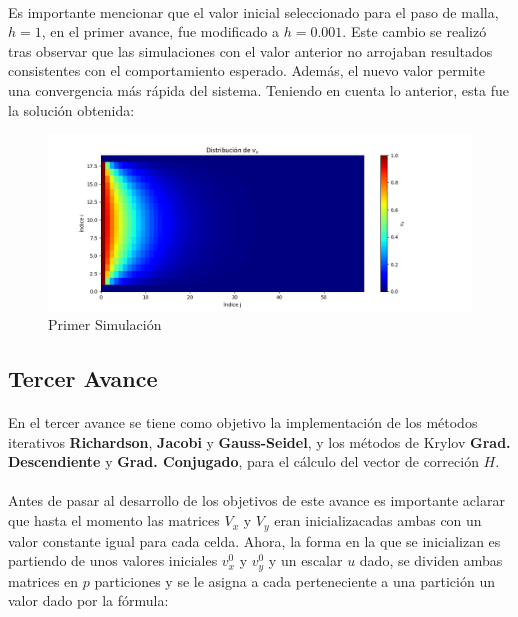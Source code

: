 \documentclass{article}
\begin{document}
  \paragraph{}
  Es importante mencionar que el valor inicial seleccionado para el paso de malla, $h=1$, en el primer avance, fue modificado a $h=0.001$. Este cambio se realizó tras observar que las simulaciones con el valor anterior no arrojaban resultados consistentes con el comportamiento esperado. Además, el nuevo valor permite una convergencia más rápida del sistema. Teniendo en cuenta lo anterior, esta fue la solución obtenida:

  \begin{figure}[H]
    \centering
    \includegraphics[width=1.2\textwidth]{GaussJordanSol.png}
    \caption{Primer Simulación}
  \end{figure}

  \subsection*{Tercer Avance}
  \paragraph{}
  En el tercer avance se tiene como objetivo la implementación de los métodos iterativos \textbf{Richardson}, \textbf{Jacobi} y \textbf{Gauss-Seidel}, y los métodos de Krylov \textbf{Grad. Descendiente} y \textbf{Grad. Conjugado}, para el cálculo del vector de correción $H$.

  \paragraph{}
  Antes de pasar al desarrollo de los objetivos de este avance es importante aclarar que hasta el momento las matrices $V_x$ y $V_y$ eran inicializacadas ambas con un valor constante igual para cada celda. Ahora, la forma en la que se inicializan es partiendo de unos valores iniciales $v_x^{0}$ y $v_y^{0}$ y un escalar $u$ dado, se dividen ambas matrices en $p$ particiones y se le asigna a cada perteneciente a una partición un valor dado por la fórmula:
\end{document}

